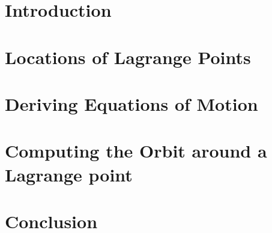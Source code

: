 \documentclass[12pt]{article}
\begin{document}
	
	
	{\singlespacing \tableofcontents}
	
	\newpage
	
	\section{Introduction}
	
	
	
	\section{Locations of Lagrange Points}
	
	
	
	\section{Deriving Equations of Motion}
	
	
	
	\section{Computing the Orbit around a Lagrange point}
	
	
	
	\section{Conclusion}
	
	\newpage
	
	\printbibliography[
	heading=bibintoc,
	title={Bibliography}
	]
	
	
	
	
	
\end{document}
